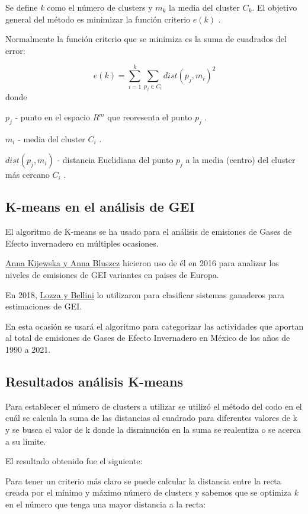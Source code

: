 \documentclass[12pt]{article}
\begin{document}
Se define \textit{k} como el número de clusters y $m_k$ la media del cluster $C_k$. El objetivo general del método es minimizar la función criterio $e(k)$ . 

Normalmente la función criterio que se minimiza es la suma de cuadrados del error:

\[e(k) = \sum_{i=1}^{k} \sum_{p_j \in C_i}^{} dist(p_j , m_i)^2 \]
donde 

$p_j$ - punto en el espacio $R^m$ que reoresenta el punto $p_j$ .

$m_i$ - media del cluster $C_i$ .

$ dist(p_j , m_i)$ - distancia Euclidiana del punto $p_j$ a la media (centro) del cluster más cercano $C_i$ . 



\subsection{K-means en el análisis de GEI}
El algoritmo de K-means se ha usado para el análisis de emisiones de Gases de Efecto invernadero en múltiples ocasiones.

\href{https://www.sciencedirect.com/science/article/pii/S1309104215305754?via%3Dihub}{Anna Kijewska y Anna Bluszcz} hicieron uso de él en 2016 para analizar los niveles de emisiones de GEI variantes en paises de Europa. \citep{KIJEWSKA2016935}

En 2018, \href{http://sedici.unlp.edu.ar/handle/10915/72763}{Lozza y Bellini} lo utilizaron para clasificar sistemas ganaderos para estimaciones de GEI. \citep{lozza2018clasificacion}

En esta ocasión se usará el algoritmo para categorizar las actividades que aportan al total de emisiones de Gases de Efecto Invernadero en México de los años de 1990 a 2021.


\subsection{Resultados análisis K-means}
Para establecer el número de clusters a utilizar se utilizó el método del codo en el cuál se calcula la suma de las distancias al cuadrado para diferentes valores de k y se busca el valor de k donde la disminución en la suma se realentiza o se acerca a su límite. 

El resultado obtenido fue el siguiente:


Para tener un criterio más claro se puede calcular la distancia entre la recta creada por el mínimo y máximo número de clusters y sabemos que se optimiza $k$ en el número que tenga una mayor distancia a la recta:
\end{document}
